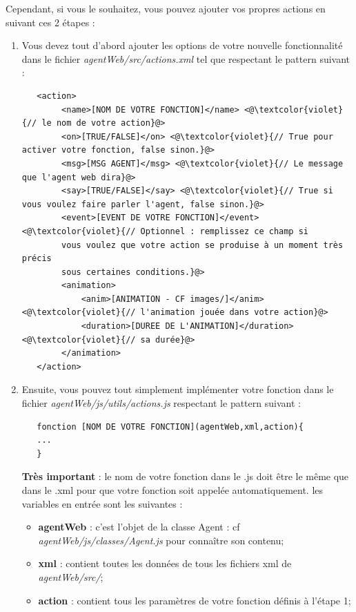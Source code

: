 \documentclass[11pt,dvipsnames,svgnames]{report}
\begin{document}
   Cependant, si vous le souhaitez, vous pouvez ajouter vos propres actions en suivant ces 2 étapes :\\
   
   \begin{enumerate} 
   \item Vous devez tout d'abord ajouter les options de votre nouvelle fonctionnalité dans le fichier \textit{agentWeb/src/actions.xml} tel que respectant le pattern suivant :\\
   \lstset{language=XML}   
   \begin{lstlisting}
   <action>
   		<name>[NOM DE VOTRE FONCTION]</name> <@\textcolor{violet}{// le nom de votre action}@>
   		<on>[TRUE/FALSE]</on> <@\textcolor{violet}{// True pour activer votre fonction, false sinon.}@>
   		<msg>[MSG AGENT]</msg> <@\textcolor{violet}{// Le message que l'agent web dira}@>
   		<say>[TRUE/FALSE]</say> <@\textcolor{violet}{// True si vous voulez faire parler l'agent, false sinon.}@>
   		<event>[EVENT DE VOTRE FONCTION]</event> <@\textcolor{violet}{// Optionnel : remplissez ce champ si 
   		vous voulez que votre action se produise à un moment très précis 
   		sous certaines conditions.}@>
   		<animation>
   			<anim>[ANIMATION - CF images/]</anim> <@\textcolor{violet}{// l'animation jouée dans votre action}@>
   			<duration>[DUREE DE L'ANIMATION]</duration> <@\textcolor{violet}{// sa durée}@>
   		</animation>
   </action>
   \end{lstlisting}
   \item Ensuite, vous pouvez tout simplement implémenter votre fonction dans le fichier \textit{agentWeb/js/utils/actions.js} respectant le pattern suivant :
   \begin{lstlisting}
   fonction [NOM DE VOTRE FONCTION](agentWeb,xml,action){
   ...
   }
   \end{lstlisting}
   \textbf{Très important} : le nom de votre fonction dans le .js doit être le même que dans le .xml pour que votre fonction soit appelée automatiquement. les variables en entrée sont les suivantes :
   \begin{itemize}
   \item \textbf{agentWeb} : c'est l'objet de la classe Agent : cf \textit{agentWeb/js/classes/Agent.js} pour connaître son contenu;
   \item \textbf{xml} : contient toutes les données de tous les fichiers xml de \textit{agentWeb/src/};
   \item \textbf{action} : contient tous les paramètres de votre fonction définis à l'étape 1;
   \end{itemize}
 \end{enumerate}
 
\end{document}
